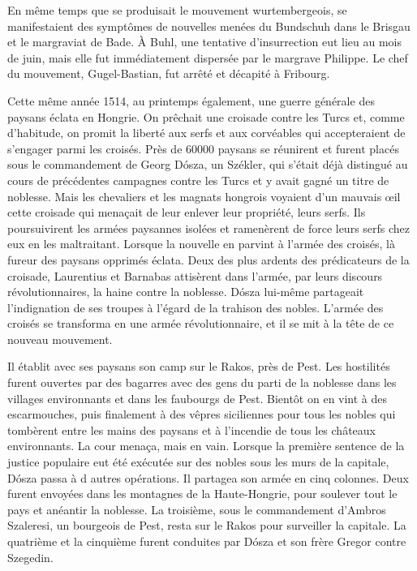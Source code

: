 \documentclass[french,twoside]{book} %
\begin{document}
En même temps que se produisait le mouvement wurtembergeois, se manifestaient des symptômes de nouvelles menées du Bundschuh dans le Brisgau et le margraviat de Bade. À Buhl, une tentative d’insurrection eut lieu au mois de juin, mais elle fut immédiatement dispersée par le margrave Philippe. Le chef du mouvement, Gugel-Bastian, fut arrêté et décapité à Fribourg.\par
Cette même année 1514, au printemps également, une guerre générale des paysans éclata en Hongrie. On prêchait une croisade contre les Turcs et, comme d’habitude, on promit la liberté aux serfs et aux corvéables qui accepteraient de s’engager parmi les croisés. Près de 60000 paysans se réunirent et furent placés sous le commandement de Georg Dósza, un Székler, qui s’était déjà distingué au cours de précédentes campagnes contre les Turcs et y avait gagné un titre de noblesse. Mais les chevaliers et les magnats hongrois voyaient d’un mauvais œil cette croisade qui menaçait de leur enlever leur propriété, leurs serfs. Ils poursuivirent les armées paysannes isolées et ramenèrent de force leurs serfs chez eux en les maltraitant. Lorsque la nouvelle en parvint à l’armée des croisés, là fureur des paysans opprimés éclata. Deux des plus ardents des prédicateurs de la croisade, Laurentius et Barnabas attisèrent dans l’armée, par leurs discours révolutionnaires, la haine contre la noblesse. Dósza lui-même partageait l’indignation de ses troupes à l’égard de la trahison des nobles. L’armée des croisés se transforma en une armée révolutionnaire, et il se mit à la tête de ce nouveau mouvement.\par
Il établit avec ses paysans son camp sur le Rakos, près de Pest. Les hostilités furent ouvertes par des bagarres avec des gens du parti de la noblesse dans les villages environnants et dans les faubourgs de Pest. Bientôt on en vint à des escarmouches, puis finalement à des vêpres siciliennes pour tous les nobles qui tombèrent entre les mains des paysans et à l’incendie de tous les châteaux environnants. La cour menaça, mais en vain. Lorsque la première sentence de la justice populaire eut été exécutée sur des nobles sous les murs de la capitale, Dósza passa à d autres opérations. Il partagea son armée en cinq colonnes. Deux furent envoyées dans les montagnes de la Haute-Hongrie, pour soulever tout le pays et anéantir la noblesse. La troisième, sous le commandement d’Ambros Szaleresi, un bourgeois de Pest, resta sur le Rakos pour surveiller la capitale. La quatrième et la cinquième furent conduites par Dósza et son frère Gregor contre Szegedin.\par
\end{document}
